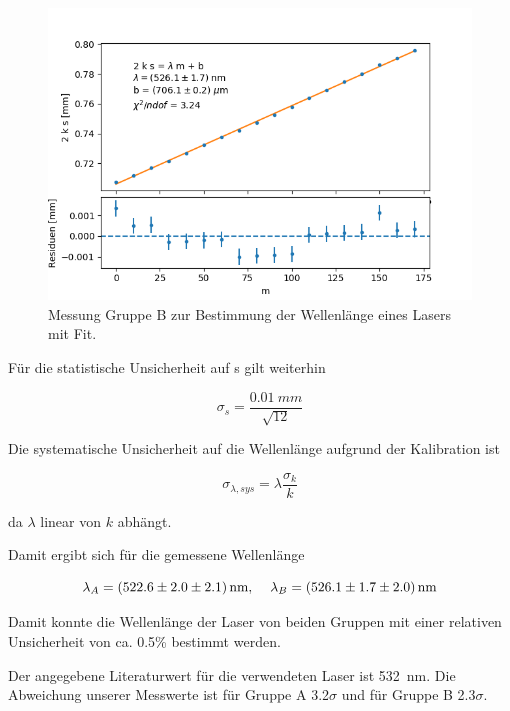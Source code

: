 \documentclass[12pt,a4paper]{article}
\begin{document}
\begin{figure}
	\centering
	\includegraphics[scale=0.8]{Bilder/Laser_B.png}
	\caption{Messung Gruppe B zur Bestimmung der Wellenlänge eines Lasers mit Fit.}
	\label{fig_fit_wellenlaenge_B}
\end{figure}

Für die statistische Unsicherheit auf s gilt weiterhin

\begin{equation*}
\sigma_s = \frac{\SI{0.01}{mm}}{\sqrt{12}}
\end{equation*}

Die systematische Unsicherheit auf die Wellenlänge aufgrund der Kalibration ist

\begin{equation}
\sigma_{\lambda, sys} = \lambda \frac{\sigma_k}{k}
\end{equation}

da $\lambda$ linear von $k$ abhängt.

Damit ergibt sich für die gemessene Wellenlänge

\begin{equation}
\lambda_A = (522.6 \pm 2.0 \pm 2.1)\,\text{nm, \quad} \lambda_B = (526.1 \pm 1.7 \pm  2.0)\,\text{nm}
\end{equation}

Damit konnte die Wellenlänge der Laser von beiden Gruppen mit einer relativen Unsicherheit von ca. 0.5\% bestimmt werden.

Der angegebene Literaturwert für die verwendeten Laser ist \SI{532}{nm}. Die Abweichung unserer Messwerte ist für Gruppe A 3.2$\sigma$ und für Gruppe B 2.3$\sigma$.
\end{document}
